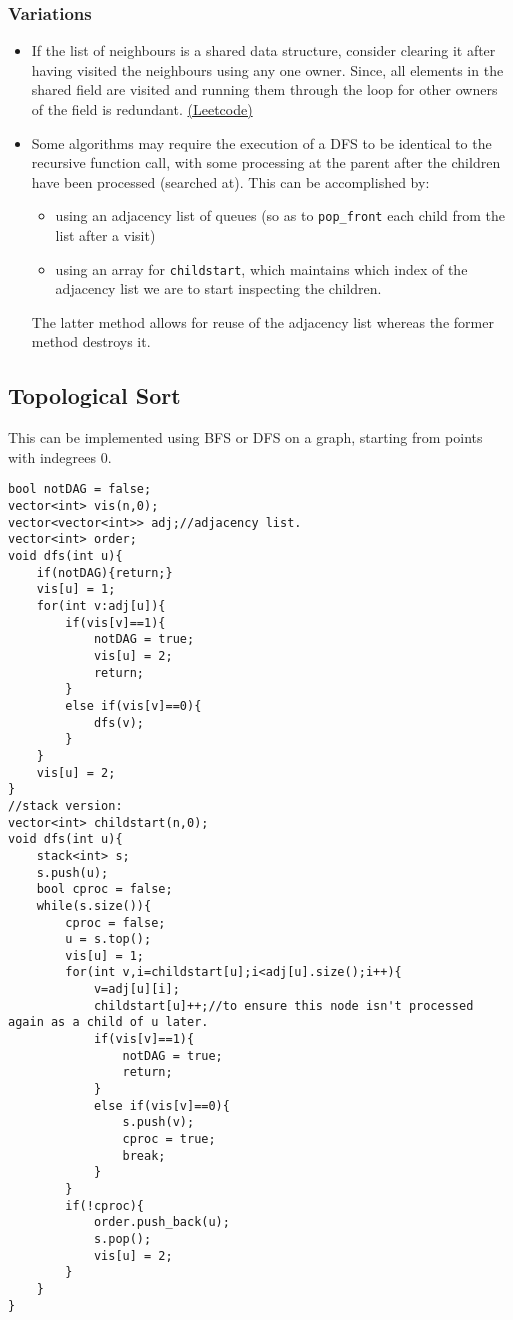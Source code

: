 \documentclass{article}
\begin{document}
\subsubsection*{Variations}
\begin{itemize}
    \item If the list of neighbours is a shared data structure, consider clearing it after having visited
    the neighbours using any one owner. Since, all elements in the shared field are visited and running them
    through the loop for other owners of the field is redundant. \href{https://leetcode.com/problems/jump-game-iv/}{(Leetcode)}
    \item Some algorithms may require the execution of a DFS to be identical to the recursive function call, with some processing at the parent after the children have been processed (searched at). This can be accomplished by: 
    \begin{itemize}
        \item using an adjacency list of queues (so as to \texttt{pop\_front} each child from the list after a visit)
        \item using an array for \texttt{childstart}, which maintains which index of the adjacency list we are to start inspecting the children.
    \end{itemize} 
    The latter method allows for reuse of the adjacency list whereas the former method destroys it.
\end{itemize}
\subsection{Topological Sort}
This can be implemented using BFS or DFS on a graph, starting from points with indegrees 0.
\begin{lstlisting}[caption=DFS implementation]
bool notDAG = false;
vector<int> vis(n,0);
vector<vector<int>> adj;//adjacency list.
vector<int> order;
void dfs(int u){
    if(notDAG){return;}
    vis[u] = 1;
    for(int v:adj[u]){
        if(vis[v]==1){
            notDAG = true;
            vis[u] = 2;
            return;
        }
        else if(vis[v]==0){
            dfs(v);
        }
    }
    vis[u] = 2;
}
//stack version:
vector<int> childstart(n,0);
void dfs(int u){
    stack<int> s;
    s.push(u);
    bool cproc = false;
    while(s.size()){
        cproc = false;
        u = s.top();
        vis[u] = 1;
        for(int v,i=childstart[u];i<adj[u].size();i++){
            v=adj[u][i];
            childstart[u]++;//to ensure this node isn't processed again as a child of u later.
            if(vis[v]==1){
                notDAG = true;
                return;
            }
            else if(vis[v]==0){
                s.push(v);
                cproc = true;
                break;
            }
        }
        if(!cproc){
            order.push_back(u);
            s.pop();
            vis[u] = 2;
        }
    }
}
\end{lstlisting}
\end{document}
